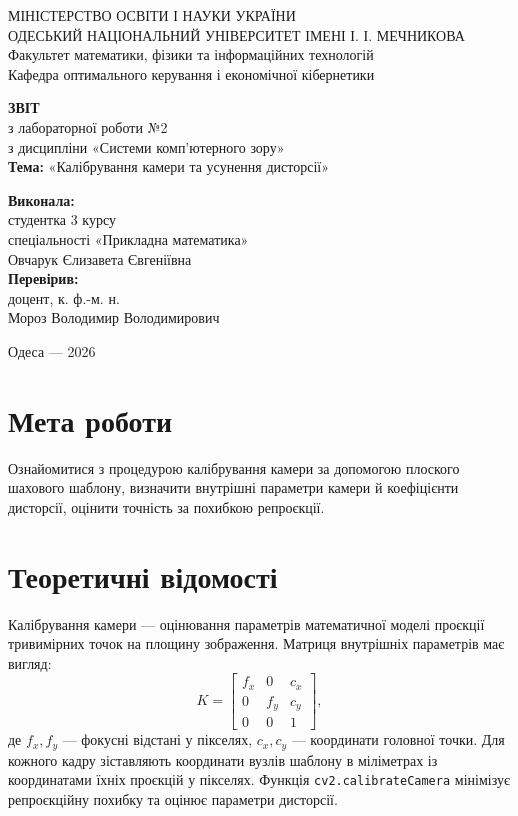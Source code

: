 \documentclass[12pt,a4paper]{article}
\begin{document}
	\begin{titlepage}
		\begin{center}
			\large
			МІНІСТЕРСТВО ОСВІТИ І НАУКИ УКРАЇНИ \\
			ОДЕСЬКИЙ НАЦІОНАЛЬНИЙ УНІВЕРСИТЕТ ІМЕНІ І. І. МЕЧНИКОВА \\
			Факультет математики, фізики та інформаційних технологій \\
			Кафедра оптимального керування і економічної кібернетики
			\vspace*{5cm}
		
			\Large\textbf{ЗВІТ}\\
			з лабораторної роботи №2 \\
			з дисципліни «Системи комп'ютерного зору» \\
			\vspace{0.5cm}
			\large\textbf{Тема:} «Калібрування камери та усунення дисторсії»
			\vspace{4cm}
			\begin{flushright}
				\textbf{Виконала:} \\
				студентка 3 курсу \\
				спеціальності «Прикладна математика» \\
				Овчарук Єлизавета Євгеніївна \\
				\vspace{1cm}
				\textbf{Перевірив:} \\
				доцент, к. ф.-м. н. \\
				Мороз Володимир Володимирович
			\end{flushright}
			\vfill Одеса --- 2026
		\end{center}
	\end{titlepage}
	\section{Мета роботи}
	Ознайомитися з процедурою калібрування камери за допомогою плоского шахового шаблону, визначити внутрішні параметри камери й коефіцієнти дисторсії, оцінити точність за похибкою репроєкції.
	\section{Теоретичні відомості}
	Калібрування камери --- оцінювання параметрів математичної моделі проєкції тривимірних точок на площину зображення. Матриця внутрішніх параметрів має вигляд:
	\begin{equation}
		K=\begin{bmatrix}f_x&0&c_x\\0&f_y&c_y\\0&0&1\end{bmatrix},
	\end{equation}
	де $f_x,f_y$ --- фокусні відстані у пікселях, $c_x,c_y$ --- координати головної точки. Для кожного кадру зіставляють координати вузлів шаблону в міліметрах із координатами їхніх проєкцій у пікселях. Функція \texttt{cv2.calibrateCamera} мінімізує репроєкційну похибку та оцінює параметри дисторсії.
\end{document}
